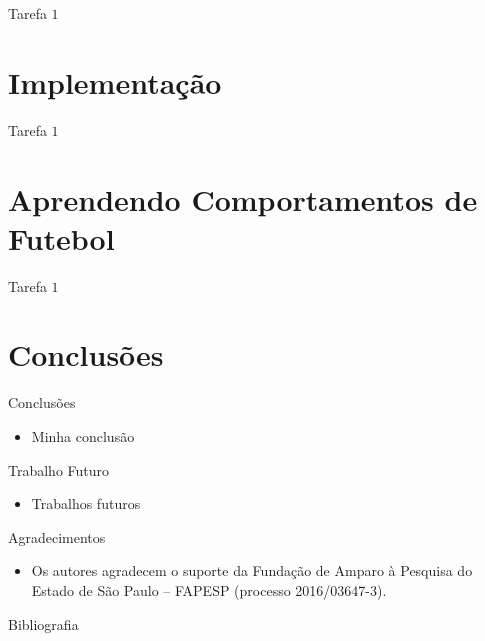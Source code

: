 \documentclass{beamer}
\begin{document}
\begin{frame}{Tarefa $1$}
\end{frame}

\section{Implementação}

\begin{frame}{Tarefa $1$}
\end{frame}

\section{Aprendendo Comportamentos de Futebol}

\begin{frame}{Tarefa $1$}
\end{frame}


\section{Conclusões}

\begin{frame}{Conclusões}
\begin{itemize}
  \item Minha conclusão
 \end{itemize}
\end{frame}

\begin{frame}{Trabalho Futuro}
  \begin{itemize}
    \item Trabalhos futuros
  \end{itemize}
\end{frame}

\begin{frame}{Agradecimentos}
\begin{itemize}
\item Os autores agradecem o suporte da Fundação de Amparo à Pesquisa do Estado de São Paulo -- FAPESP (processo 2016/03647-3).
\end{itemize}
\end{frame}

\begin{frame}[allowframebreaks]{Bibliografia}
\printbibliography
%
%
\end{frame}
\end{document}
